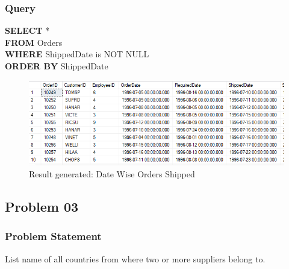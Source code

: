 \documentclass[12pt,a4paper]{report}
\begin{document}
\subsubsection{Query}
\begin{center}
	\begin{minipage}{12cm}
		\textbf{SELECT} * \\
		\textbf{FROM} Orders\\
		\textbf{WHERE} ShippedDate is NOT NULL\\
		\textbf{ORDER BY} ShippedDate 
	\end{minipage}
	\begin{figure}[h]
	\centering
		\includegraphics[scale=0.7]{images/8.png}
		\caption{Result generated: Date Wise Orders Shipped}
	\end{figure}
\end{center}


\subsection{Problem 03}
\subsubsection{Problem Statement}
List name of all countries from where two or more suppliers belong to.
\end{document}
